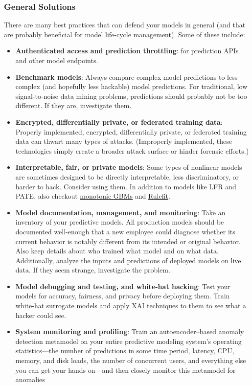 \documentclass[11pt,
               aspectratio=169,
               hyperref={colorlinks}
               ]{beamer}
\begin{document}
			\begin{frame}[t, allowframebreaks]	
		
				\frametitle{General Solutions}	
			
				\small There are many best practices that can defend your models in general (and that are probably beneficial for model life-cycle management). Some of these include:
			
				\begin{itemize}
					\item \textbf{Authenticated access and prediction throttling}: for prediction APIs and other model endpoints.
					\item \textbf{Benchmark models}: Always compare complex model predictions to less complex (and hopefully less hackable) model predictions. For traditional, low signal-to-noise data mining problems, predictions should probably not be too different. If they are, investigate them.
					\item \textbf{Encrypted, differentially private, or federated training data}: Properly implemented, encrypted, differentially private, or federated training data can thwart many types of attacks. (Improperly implemented, these technologies simply create a broader attack surface or hinder forensic efforts.)		
					\item \textbf{Interpretable, fair, or private models}: Some types of nonlinear models are sometimes designed to be directly interpretable, less discriminatory, or harder to hack. Consider using them. In addition to models like LFR and PATE, also checkout \href{https://github.com/h2oai/h2o-3/blob/master/h2o-py/demos/H2O_tutorial_gbm_monotonicity.ipynb}{monotonic GBMs} and \href{https://christophm.github.io/interpretable-ml-book/rulefit.html}{Rulefit}.
					\item \textbf{Model documentation, management, and monitoring}: Take an inventory of your predictive models. All production models should be documented well-enough that a new employee could diagnose whether its current behavior is notably different from its intended or original behavior. Also keep details about who trained what model and on what data. Additionally, analyze the inputs and predictions of deployed models on live data. If they seem strange, investigate the problem.	
					\item \textbf{Model debugging and testing, and white-hat hacking}: Test your models for accuracy, fairness, and privacy before deploying them. Train white-hat surrogate models and apply XAI techniques to them to see what a hacker could see. 
					\item \textbf{System monitoring and profiling}: Train an autoencoder–based anomaly detection metamodel on your entire predictive modeling system’s operating statistics—the number of predictions in some time period, latency, CPU, memory, and disk loads, the number of concurrent users, and everything else you can get your hands on—and then closely monitor this metamodel for anomalies
				\end{itemize}
				\normalsize

			\end{frame}
\end{document}
